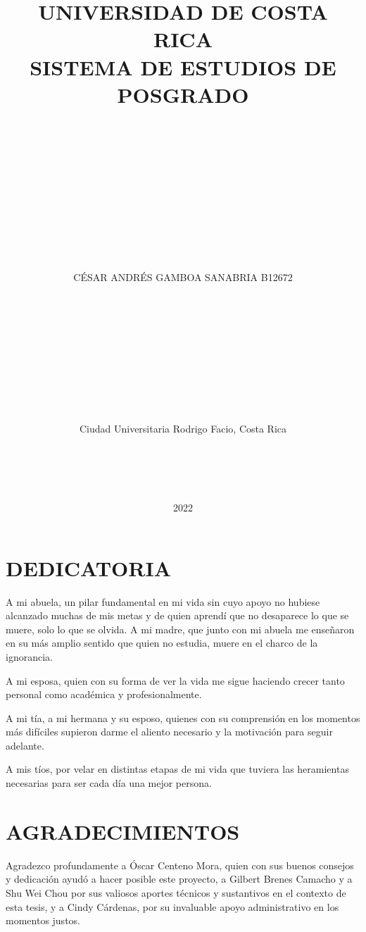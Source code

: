 \documentclass[
]{article}
\title{UNIVERSIDAD DE COSTA RICA\\
SISTEMA DE ESTUDIOS DE POSGRADO\\
\strut \\
\strut \\
\strut \\}
\subtitle{LA SOBREPARAMETRIZACIÓN EN EL ARIMA: UNA APLICACIÓN A DATOS
COSTARRICENCES\\
\strut \\
\strut \\
\strut \\
\strut \\
Tesis sometida a la consideración de la Comisión del Programa de
Estudios de Posgrado en Estadística para optar por el grado y título de
Maestría Académica en Estadística}
\author{\hfill\break
\hfill\break
\hfill\break
\hfill\break
\hfill\break
CÉSAR ANDRÉS GAMBOA SANABRIA B12672\\
\strut \\
\strut \\
\strut \\
\strut \\
\strut \\
Ciudad Universitaria Rodrigo Facio, Costa Rica\\
\strut \\
\strut \\}
\date{2022}
\begin{document}
\maketitle

\cleardoublepage

\newpage

\section*{DEDICATORIA}


A mi abuela, un pilar fundamental en mi vida sin cuyo apoyo no hubiese
alcanzado muchas de mis metas y de quien aprendí que no desaparece lo
que se muere, solo lo que se olvida. A mi madre, que junto con mi abuela
me enseñaron en su más amplio sentido que quien no estudia, muere en el
charco de la ignorancia.

A mi esposa, quien con su forma de ver la vida me sigue haciendo crecer
tanto personal como académica y profesionalmente.

A mi tía, a mi hermana y su esposo, quienes con su comprensión en los
momentos más difíciles supieron darme el aliento necesario y la
motivación para seguir adelante.

A mis tíos, por velar en distintas etapas de mi vida que tuviera las
heramientas necesarias para ser cada día una mejor persona.

\cleardoublepage

\section*{AGRADECIMIENTOS}

Agradezco profundamente a Óscar Centeno Mora, quien con sus buenos
consejos y dedicación ayudó a hacer posible este proyecto, a Gilbert
Brenes Camacho y a Shu Wei Chou por sus valiosos aportes técnicos y
sustantivos en el contexto de esta tesis, y a Cindy Cárdenas, por su
invaluable apoyo administrativo en los momentos justos.

\cleardoublepage
\end{document}
